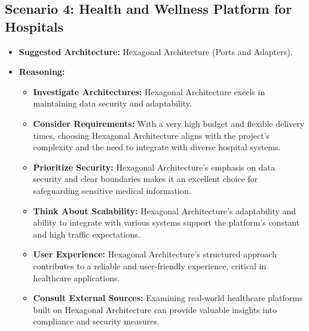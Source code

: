\subsection*{Scenario 4: Health and Wellness Platform for Hospitals}
\begin{itemize}
	\item \textbf{Suggested Architecture:} Hexagonal Architecture (Ports and Adapters).
	\item \textbf{Reasoning:}
	\begin{itemize}
		\item \textbf{Investigate Architectures:} Hexagonal Architecture excels in maintaining data security and adaptability.
		\item \textbf{Consider Requirements:} With a very high budget and flexible delivery times, choosing Hexagonal Architecture aligns with the project's complexity and the need to integrate with diverse hospital systems.
		\item \textbf{Prioritize Security:} Hexagonal Architecture's emphasis on data security and clear boundaries makes it an excellent choice for safeguarding sensitive medical information.
		\item \textbf{Think About Scalability:} Hexagonal Architecture's adaptability and ability to integrate with various systems support the platform's constant and high traffic expectations.
		\item \textbf{User Experience:} Hexagonal Architecture's structured approach contributes to a reliable and user-friendly experience, critical in healthcare applications.
		\item \textbf{Consult External Sources:} Examining real-world healthcare platforms built on Hexagonal Architecture can provide valuable insights into compliance and security measures.
	\end{itemize}
\end{itemize}

